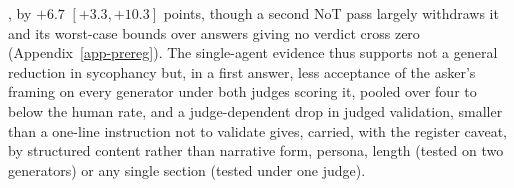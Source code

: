 \citep{petrov2025brokenmath}, by $+6.7$ $[+3.3, +10.3]$ points, though a
second NoT pass largely withdraws it and its worst-case bounds over answers
giving no verdict cross zero (Appendix~\ref{app-prereg}).
The single-agent evidence thus supports not a general reduction in
sycophancy but, in a first answer, less acceptance of the asker's framing on
every generator under both judges scoring it, pooled over four to below the
human rate, and a judge-dependent drop in judged validation, smaller than a
one-line instruction not to validate gives, carried, with the register
caveat, by structured content rather than narrative form, persona, length
(tested on two generators) or any single section (tested under one judge).
